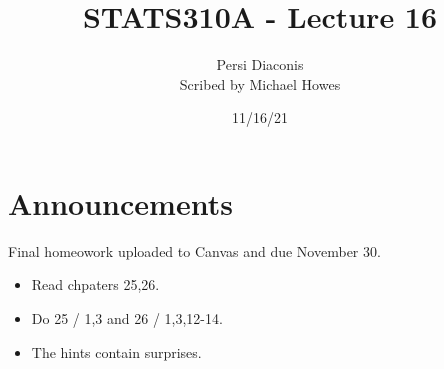 




\title{STATS310A - Lecture 16}
\author{Persi Diaconis\\ Scribed by Michael Howes}
\date{11/16/21}

\pagestyle{fancy}
\fancyhf{}


\maketitle
\tableofcontents
\section{Announcements}
Final homeowork uploaded to Canvas and due November 30.
\begin{itemize}
    \item Read chpaters 25,26.
    \item Do 25 / 1,3 and 26 / 1,3,12-14.
    \item The hints contain surprises.
\end{itemize}
